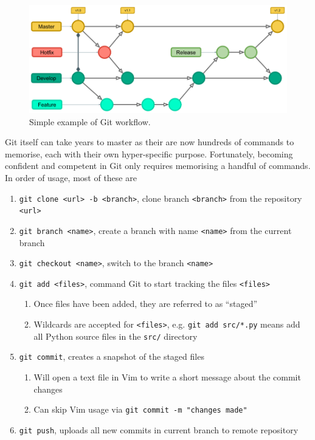 \documentclass[11pt]{article}
\begin{document}
\begin{figure}[t!]
    \centering
    \includegraphics[width=1.0\textwidth]{figures/git_tree.png}
    \caption{Simple example of Git workflow.}
    \label{fig:git-basic-usage}
\end{figure}

Git itself can take years to master as their are now hundreds of commands to memorise, each with their own hyper-specific purpose. Fortunately, becoming confident and competent in Git only requires memorising a handful of commands. In order of usage, most of these are

\begin{enumerate}
    \item \texttt{git clone <url> -b <branch>}, clone branch \texttt{<branch>} from the repository \texttt{<url>}
    \item \texttt{git branch <name>}, create a branch with name \texttt{<name>} from the current branch
    \item \texttt{git checkout <name>}, switch to the branch \texttt{<name>}
    \item \texttt{git add <files>}, command Git to start tracking the files \texttt{<files>}
    \begin{enumerate}
        \item Once files have been added, they are referred to as ``staged''
        \item Wildcards are accepted for \texttt{<files>}, e.g. \texttt{git add src/*.py} means add all Python source files in the \texttt{src/} directory
    \end{enumerate}
    \item \texttt{git commit}, creates a snapshot of the staged files
    \begin{enumerate}
        \item Will open a text file in Vim to write a short message about the commit changes
        \item Can skip Vim usage via \texttt{git commit -m "changes made"}
    \end{enumerate}
    \item \texttt{git push}, uploads all new commits in current branch to remote repository
\end{enumerate}
\end{document}
